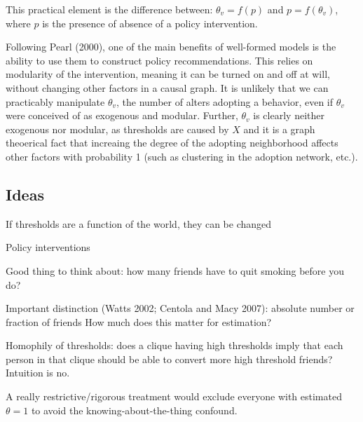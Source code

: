 \documentclass{article}
\begin{document}
This practical element is the difference between:
$\theta_v = f(p)$ and $p = f(\theta_v)$, where $p$ is the presence of absence of a policy intervention.

Following Pearl (2000), one of the main benefits of well-formed models is the ability to use them to construct policy recommendations. This relies on modularity of the intervention, meaning it can be turned on and off at will, without changing other factors in a causal graph. It is unlikely that we can practicably manipulate $\theta_v$, the number of alters adopting a behavior, even if $\theta_v$ were conceived of as exogenous and modular. Further, $\theta_v$ is clearly neither exogenous nor modular, as thresholds are caused by $X$ and it is a graph theoerical fact that increaing the degree of the adopting neighborhood affects other factors with probability 1 (such as clustering in the adoption network, etc.).







\subsection{Ideas}

If thresholds are a function of the world, they can be changed

Policy interventions

Good thing to think about: how many friends have to quit smoking before you do?

Important distinction (Watts 2002; Centola and Macy 2007): absolute number or fraction of friends
How much does this matter for estimation?

Homophily of thresholds: does a clique having high thresholds imply that each person in that clique should be able to convert more high threshold friends? Intuition is no.

A really restrictive/rigorous treatment would exclude everyone with estimated $\theta = 1$ to avoid the knowing-about-the-thing confound.
\end{document}
